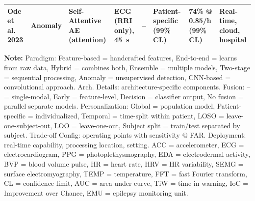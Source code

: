 \begin{landscape}
\begin{table}[htbp]
\begin{tabularx}{\linewidth}{@{} l X X X X X X X @{}}
\textbf{Ode et al. 2023} & Anomaly & Self-Attentive AE (attention) & ECG (RRI only), 45~s & -- & Patient-specific (99\% CL) & 74\% @ 0.85/h (99\% CL) & Real-time, cloud, hospital \\
\bottomrule
\end{tabularx}
\par\medskip
\footnotesize
\textbf{Note:} Paradigm: Feature-based = handcrafted features, End-to-end = learns from raw data, Hybrid = combines both, Ensemble = multiple models, Two-stage = sequential processing, Anomaly = unsupervised detection, CNN-based = convolutional approach. Arch. Details: architecture-specific components. Fusion: -- = single-modal, Early = feature-level, Decision = classifier output, No fusion = parallel separate models. Personalization: Global = population model, Patient-specific = individualized, Temporal = time-split within patient, LOSO = leave-one-subject-out, LOO = leave-one-out, Subject split = train/test separated by subject. Trade-off Config: operating points with sensitivity @ FAR. Deployment: real-time capability, processing location, setting. ACC = accelerometer, ECG = electrocardiogram, PPG = photoplethysmography, EDA = electrodermal activity, BVP = blood volume pulse, HR = heart rate, HRV = HR variability, SEMG = surface electromyography, TEMP = temperature, FFT = fast Fourier transform, CL = confidence limit, AUC = area under curve, TiW = time in warning, IoC = Improvement over Chance, EMU = epilepsy monitoring unit.
\end{table}
\end{landscape}
